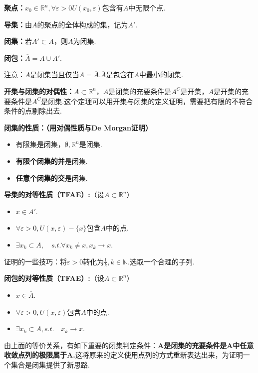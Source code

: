 \documentclass[bwprint, withoutpreface]{cumcmthesis}
\begin{document}
\textbf{聚点：}$x_0 \in \mathbb{R}^n, \forall \varepsilon > 0 U(x_0, \varepsilon) \mbox{包含有} A \mbox{中无限个点} $.

\textbf{导集：}由$A$的聚点的全体构成的集，记为$A'$.

\textbf{闭集：}若$A' \subset A$，则$A$为闭集.

\textbf{闭包：}$\overline{A} = A \cup A'$.

注意：$A$是闭集当且仅当$A = \overline{A}$.$\overline{A}$是包含在$A$中最小的闭集.

\textbf{开集与闭集的对偶性：}$A \subset \mathbb{R}^n$，$A$是闭集的充要条件是$A^C$是开集，$A$是开集的充要条件是$A^C$是闭集.这个定理可以用开集与闭集的定义证明，需要把有限的不符合条件的点剔除出去.

\textbf{闭集的性质：（用对偶性质与De Morgan证明）}
\begin{itemize}[itemindent=2em]
	\item 有限集是闭集，$\emptyset, \mathbb{R}^n$是闭集.
	\item \textbf{有限个闭集的并}是闭集.
	\item \textbf{任意个闭集的交}是闭集.  
\end{itemize}

\textbf{导集的对等性质（TFAE）:}（设$A \subset \mathbb{R}^n$）
\begin{itemize}[itemindent=2em]
	\item $x \in A'$.
	\item $\forall \varepsilon > 0, U(x, \varepsilon) - \{x\} \mbox{包含$A$中的点}$.
	\item $\exists {x_k} \subset A, \quad s.t. \forall{x_k \neq x}, x_k \to x$. 
\end{itemize}

证明的一些技巧：将$\varepsilon > 0$转化为$\frac{1}{k}, k \in \mathbb{N}$.选取一个合理的子列.

\textbf{闭包的对等性质（TFAE）:}（设$A \subset \mathbb{R}^n$）
\begin{itemize}[itemindent=2em]
	\item $x \in \overline{A}$.
	\item $\forall \varepsilon > 0, U(x, \varepsilon) \mbox{包含$A$中的点}$.
	\item $\exists {x_k} \subset A, s.t.\quad x_k \to x$. 
\end{itemize}

由上面的等价关系，有如下重要的闭集判定条件：\textbf{A是闭集的充要条件是A中任意收敛点列的极限属于A.}这将原来的定义使用点列的方式重新表达出来，为证明一个集合是闭集提供了新思路.
\end{document}
